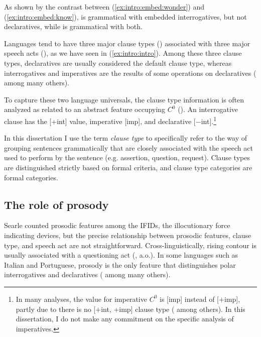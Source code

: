 As shown by the contrast between (\ref{ex:intro:embed:wonder}) and (\ref{ex:intro:embed:know}),  is grammatical with embedded interrogatives, but not declaratives, while  is grammatical with both.



Languages tend to have three major clause types (\diis{}) associated with three major speech acts (\aqrs{}), as we have seen in (\ref{ex:intro:intro}). Among these three clause types, declaratives are usually considered the default clause type, whereas interrogatives and imperatives are the results of some operations on declaratives (\cite{sz1985speechact, chomsky1957,chomsky1995minimalist, akmajian1984clausetype, platzack1997imp,rizzi1997} among many others). 



To capture these two language universals, the clause type information is often analyzed as related to an abstract feature occupying $C^{0}$ (\cite{chomsky1995minimalist, cheng1991, rizzi1997, rizzi2001int, chomskylasnik1977,platzack1997imp,akmajian1984clausetype, han1998imp}). An interrogative clause has the [+int] value, imperative [imp], and declarative [$-$int].\footnote{In many analyses, the value for imperative $C^{0}$ is [imp] instead of [$+$imp], partly due to there is no [$+$int, +imp] clause type (\cite{platzack1997imp,han1998imp} among others). In this dissertation, I do not make any commitment on the specific analysis of imperatives.} 



In this dissertation I use the term \emph{clause type} to specifically refer to the way of grouping sentences grammatically that are closely associated with the speech act used to perform by the sentence (e.g. assertion, question, request). Clause types are distinguished strictly based on formal criteria, and clause type categories are formal categories. 

\subsection{The role of prosody}
\label{sec:bg:theory:prosody}

Searle counted prosodic features among the IFIDs, the illocutionary force indicating devices, but the
precise relationship between prosodic features, clause type, and speech act are not straightforward. Cross-linguistically, rising contour is usually associated with a questioning act (\citealt{bolinger1978, ladd1981, gussenhovenchen2000, ladd2001typology}, a.o.). In some languages such as Italian and Portuguese, prosody is the only feature that distinguishes polar interrogatives and declaratives (\citealt{truckenbrodt2009prosody} among many others). 

